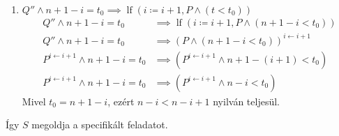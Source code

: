 \documentclass[a4paper,12pt]{article}
\DeclareMathOperator{\lf}{lf}
\begin{document}
\begin{solution}
\begin{enumerate}
\begin{enumerate}
\begin{enumerate}
					\item $ Q'' \land n + 1 - i = t_0 \implies \lf(i \coloneq i + 1, P \land (t < t_0)) $
					\begin{align*}
						Q'' \land n + 1 - i = t_0 &\implies \lf(i \coloneq i + 1, P \land (n + 1 - i < t_0)) \\
						Q'' \land n + 1 - i = t_0&\implies (P \land (n + 1 - i < t_0))^{i\leftarrow i+1} \\
						P^{i \leftarrow i + 1} \land n + 1 - i = t_0 &\implies (P^{i \leftarrow i + 1} \land n + 1 - (i + 1) < t_0) \\
						P^{i \leftarrow i + 1} \land n + 1 - i = t_0 &\implies (P^{i \leftarrow i + 1} \land n - i < t_0)
					\end{align*}
					Mivel $t_0 = n + 1 - i$, ezért $ n - i < n - i  + 1$ nyilván teljesül.
				\end{enumerate}
			\end{enumerate}
		\end{enumerate}
		Így $S$ megoldja a specifikált feladatot.
	\end{solution}
\end{document}
